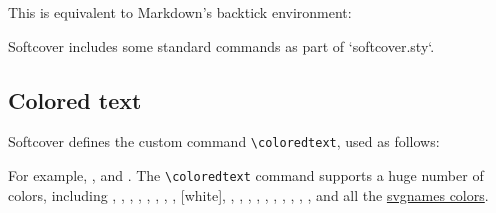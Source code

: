 \noindent This is equivalent to Markdown's backtick environment:

\begin{code}
Softcover includes some standard commands as part of `softcover.sty`.
\end{code}

\subsection{Colored text} %
\label{sec:colored_text}

Softcover defines the custom command \verb+\coloredtext+, used as follows:

\begin{code}
\end{code}

\noindent For example, , and . The \verb+\coloredtext+ command supports a huge number of colors, including
,
,
,
,
,
,
,
,
 [white],
,
,
,
,
,
,
,
,
,
, and all the \href{http://www.latextemplates.com/svgnames-colors}{svgnames colors}.



